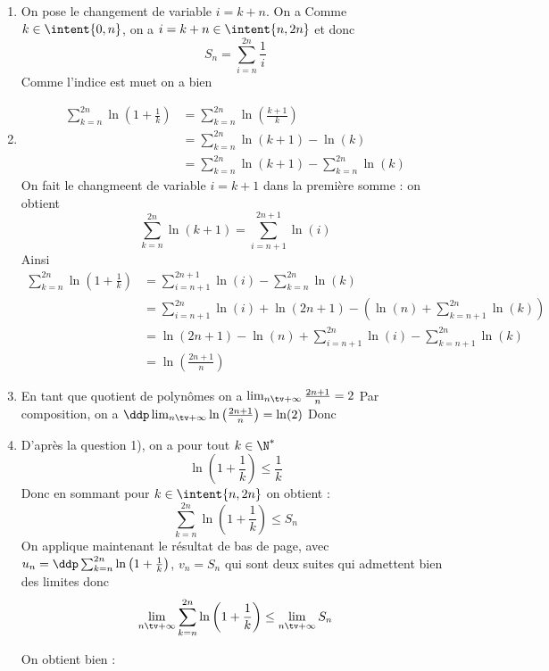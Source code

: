 \begin{correction}
\begin{enumerate}
\begin{enumerate}
 \item On pose le changement de variable $i=k+n$. On a 
 Comme $k\in \intent{0,n}$, on a $i=k+n\in \intent{n,2n}$ et donc 
 $$S_n = \sum_{i=n}^{2n} \frac{1}{i}$$
 Comme l'indice est muet on a bien 
 
 \item 
 \begin{align*}
 \sum_{k=n}^{2n} \ln\left( 1 +\frac{1}{k}\right) &=  \sum_{k=n}^{2n} \ln\left( \frac{k+1}{k}\right)\\
  &=  \sum_{k=n}^{2n} \ln\left( k+1\right) - \ln(k)\\
  &=  \sum_{k=n}^{2n} \ln\left( k+1\right) -  \sum_{k=n}^{2n} \ln(k)
 \end{align*}
 On fait le changmeent de variable $i = k+1$  dans la première somme : on obtient 
$$ \sum_{k=n}^{2n} \ln\left( k+1\right)  = \sum_{i=n+1}^{2n+1} \ln(i)  $$
Ainsi 
 \begin{align*}
 \sum_{k=n}^{2n} \ln\left( 1 +\frac{1}{k}\right) &= \sum_{i=n+1}^{2n+1} \ln(i)  - \sum_{k=n}^{2n}\ln(k)\\
 &=\sum_{i=n+1}^{2n} \ln(i) +\ln(2n+1)  -\left( \ln(n)+ \sum_{k=n+1}^{2n}\ln(k)\right)\\
  &=\ln(2n+1) -\ln(n) + \sum_{i=n+1}^{2n} \ln(i) - \sum_{k=n+1}^{2n}\ln(k)\\
  &=\ln\left(\frac{2n+1}{n}\right)
 \end{align*}

\item En tant que quotient de polynômes on a $\lim_{n\tv +\infty } \frac{2n+1}{n}= 2$
Par composition, on a 
$\ddp \lim_{n\tv+\infty }  \ln\left(\frac{2n+1}{n}\right)= \ln(2)$
Donc 

\item D'après la question 1), on a pour tout $k\in \N^*$ 
$$\ln\left( 1 +\frac{1}{k}\right) \leq \frac{1}{k}$$
Donc en sommant pour $k\in \intent{n,2n}$ on obtient : 
$$\sum_{k=n}^{2n} \ln\left( 1 +\frac{1}{k}\right)\leq S_n$$
On applique maintenant le résultat de bas de page, avec $u_n =\ddp  \sum_{k=n}^{2n} \ln\left( 1 +\frac{1}{k}\right)$, $v_n =S_n$ qui sont deux suites qui admettent bien des limites donc 
$$\lim_{n\tv +\infty}  \sum_{k=n}^{2n} \ln\left( 1 +\frac{1}{k}\right) \leq \lim_{n\tv +\infty} S_n$$

On obtient bien : 





\end{enumerate}
\end{enumerate}
\end{correction}
